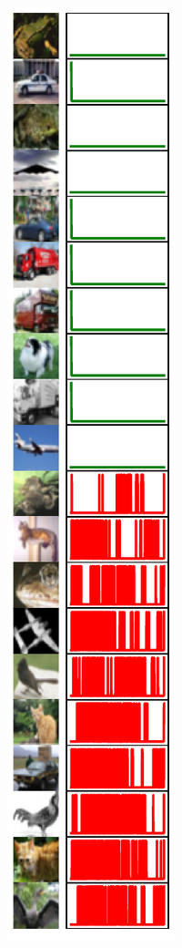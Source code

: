 \begin{figure}[t]
\vspace{-5pt}
\centering

\begin{subfigure}[b]{0.23\linewidth}
  \centering
  \includegraphics[width=\linewidth]{figs/sptd/cifar10_points_ext.pdf}

\end{subfigure}
\end{figure}
